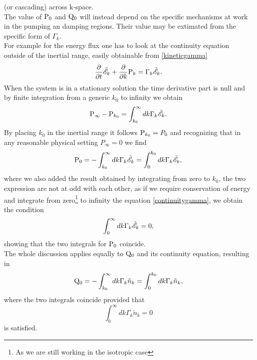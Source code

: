 (or cascading) across k-space.\\
The value of $\mathrm{P}_0$ and $\mathrm{Q}_0$ will instead depend on the specific mechanisms at work in the pumping an damping regions. Their value may be extimated 
from the specific form of $\Gamma_k$. \\
For example for the energy flux one has to look at the continuity equation outside of the inertial range, easily obtainable from \eqref{kineticgamma} 
\begin{equation}
    \frac{\partial}{\partial t} \tilde{\mathscr{E}}_k + \frac{\partial}{\partial k}  \mathrm{P}_k = \Gamma_k \tilde{\mathscr{E}}_k. 
    \label{continuitygamma}
\end{equation}
When the system is in a stationary solution the time derivative part is null and by finite integration from a generic $k_0$ to infinity we obtain
\begin{equation}
\mathrm{P}_{\infty} - \mathrm{P}_{k_0} = \int_{k_0}^{\infty} dk \Gamma_k \tilde{\mathscr{E}}_k.
\end{equation}
By placing $k_0$ in the inertial range it follows $\mathrm{P}_{k_0} = P_0$ and recognizing that in any reasonable physical setting $P_{\infty} = 0$ we find
\begin{equation}
    \mathrm{P}_0 = - \int_{k_0}^{\infty} dk \Gamma_k \tilde{\mathscr{E}}_k = \int_{0}^{k_0} dk \Gamma_k \tilde{\mathscr{E}}_k,
\end{equation}
where we also added the result obtained by integrating from zero to $k_0$, the two expression are not at odd with each other, as if we require conservation of energy 
and integrate from zero\footnote{As we are still working in the isotropic case} to infinity the equation \eqref{continuitygamma}, we obtain the condition 
\begin{equation}
    \int_{0}^{\infty} dk \Gamma_k\tilde{\mathscr{E}}_k = 0, 
\end{equation}
showing that the two integrals for $\mathrm{P}_0$ coincide. \\
The whole discussion applies equally to $\mathrm{Q}_0$ and its continuity equation, resulting in 
\begin{equation}
    \mathrm{Q}_0 = - \int_{k_0}^{\infty} dk \Gamma_k \tilde{n}_k = \int_{0}^{k_0} dk \Gamma_k \tilde{n}_k,
\end{equation}
where the two integrals coincide provided that 
\begin{equation}
    \int_{0}^{\infty} dk \Gamma_k\tilde{n}_k = 0
\end{equation}
is satisfied. \\

